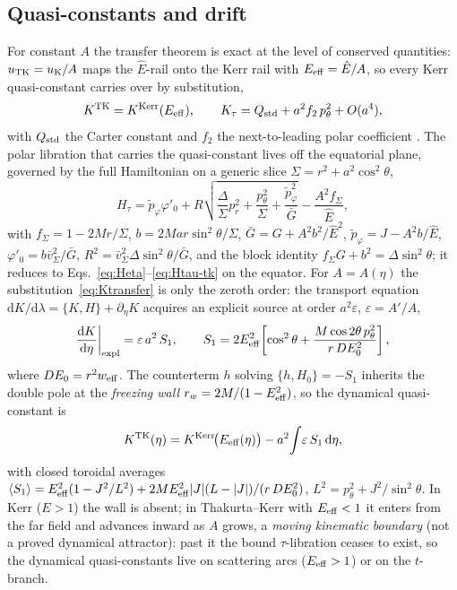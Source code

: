 \documentclass[12pt]{iopart}
\newcommand{\Ehat}{\hat E}
\newcommand{\dd}{\mathrm{d}}
\begin{document}
\subsection{Quasi-constants and drift}
\label{sec:quasiconst}
For constant $A$ the transfer theorem is exact at the level of conserved
quantities: $u_{\rm TK}=u_{\rm K}/A$ maps the $\Ehat$-rail onto the Kerr rail with
$E_{\rm eff}=\Ehat/A$, so every Kerr quasi-constant carries over by substitution,
\begin{equation}
    K^{\rm TK}=K^{\rm Kerr}(E_{\rm eff}),\qquad
    K_\tau=Q_{\rm std}+a^2 f_2\,p_\theta^2+O(a^4),
    \label{eq:Ktransfer}
\end{equation}
with $Q_{\rm std}$ the Carter constant and $f_2$ the next-to-leading polar
coefficient \cite{Carter1968,RosignoliKerr}. The polar libration that carries the
quasi-constant lives off the equatorial plane, governed by the full Hamiltonian
on a generic slice $\Sigma=r^2+a^2\cos^2\theta$,
\begin{equation}
    H_\tau=\tilde p_\varphi\varphi'_0
      +R\sqrt{\frac{\Delta}{\Sigma}p_r^2+\frac{p_\theta^2}{\Sigma}
      +\frac{\tilde p_\varphi^2}{\bar G}}-\frac{A^2 f_\Sigma}{\Ehat},
    \label{eq:H3d}
\end{equation}
with $f_\Sigma=1-2Mr/\Sigma$, $b=2Mar\sin^2\theta/\Sigma$,
$\bar G=G+A^2 b^2/\Ehat^2$, $\tilde p_\varphi=J-A^2 b/\Ehat$,
$\varphi'_0=b\bar v_\Sigma^2/\bar G$, $R^2=\bar v_\Sigma^2\Delta\sin^2\theta/\bar G$,
and the block identity $f_\Sigma G+b^2=\Delta\sin^2\theta$; it reduces to
Eqs.~\eqref{eq:Heta}--\eqref{eq:Htau-tk} on the equator. For $A=A(\eta)$ the
substitution~\eqref{eq:Ktransfer} is only the zeroth order: the transport equation
$\dd K/\dd\lambda=\{K,H\}+\partial_\eta K$ acquires an explicit source at order
$a^2\varepsilon$, $\varepsilon=A'/A$,
\begin{equation}
    \frac{\dd K}{\dd\eta}\bigg|_{\rm expl}=\varepsilon\,a^2\,S_1,\qquad
    S_1=2E_{\rm eff}^2\!\left[\cos^2\theta
        +\frac{M\cos2\theta\,p_\theta^2}{r\,DE_0^2}\right],
    \label{eq:S1}
\end{equation}
where $DE_0=r^2 w_{\rm eff}$. The counterterm $h$ solving $\{h,H_0\}=-S_1$
inherits the double pole at the \emph{freezing wall}
$r_w=2M/(1-E_{\rm eff}^2)$, so the dynamical quasi-constant is
\begin{equation}
    K^{\rm TK}(\eta)=K^{\rm Kerr}\!\big(E_{\rm eff}(\eta)\big)
        -a^2\!\int\!\varepsilon\,S_1\,\dd\eta,
    \label{eq:Kdyn}
\end{equation}
with closed toroidal averages
$\langle S_1\rangle=E_{\rm eff}^2(1-J^2/L^2)
+2ME_{\rm eff}^2|J|(L-|J|)/(r\,DE_0^2)$, $L^2=p_\theta^2+J^2/\sin^2\theta$. In
Kerr ($E>1$) the wall is absent; in Thakurta--Kerr with $E_{\rm eff}<1$ it enters
from the far field and advances inward as $A$ grows, a \emph{moving kinematic
boundary} (not a proved dynamical attractor): past it the bound $\tau$-libration
ceases to exist, so the dynamical quasi-constants live on scattering arcs
($E_{\rm eff}>1$) or on the $t$-branch.
\end{document}
